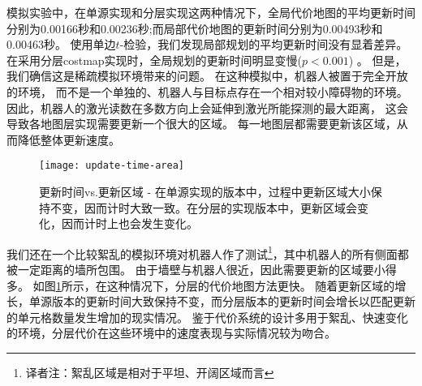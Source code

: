 模拟实验中，在单源实现和分层实现这两种情况下，全局代价地图的平均更新时间分别为0.00166秒和0.00236秒;而局部代价地图的更新时间分别为0.00493秒和0.00463秒。 使用单边$t$-检验，我们发现局部规划的平均更新时间没有显着差异。 
在采用分层costmap实现时，全局规划的更新时间明显变慢($p<0.001$) 。
但是，我们确信这是稀疏模拟环境带来的问题。 
在这种模拟中，机器人被置于完全开放的环境，
而不是一个单独的、机器人与目标点存在一个相对较小障碍物的环境。
因此，机器人的激光读数在多数方向上会延伸到激光所能探测的最大距离，
这会导致各地图层实现需要更新一个很大的区域。
每一地图层都需要更新该区域，从而降低整体更新速度。

\begin{figure}[!htb]
	\centering
	\texttt{[image: update-time-area]}
	\caption{更新时间vs.更新区域 - 在单源实现的版本中，过程中更新区域大小保持不变，因而计时大致一致。在分层的实现版本中，更新区域会变化，因而计时上也会发生变化。}
	\label{fig:costMap:update-time-area}
\end{figure}

我们还在一个比较絮乱的模拟环境对机器人作了测试\footnote{译者注：絮乱区域是相对于平坦、开阔区域而言}，其中机器人的所有侧面都被一定距离的墙所包围。 由于墙壁与机器人很近，因此需要更新的区域要小得多。 
如图\ref{fig:costMap:update-time-area}所示，在这种情况下，分层的代价地图方法更快。 随着更新区域的增长，单源版本的更新时间大致保持不变，而分层版本的更新时间会增长以匹配更新的单元格数量发生增加的现实情况。 
鉴于代价系统的设计多用于絮乱、快速变化的环境，分层代价在这些环境中的速度表现与实际情况较为吻合。

